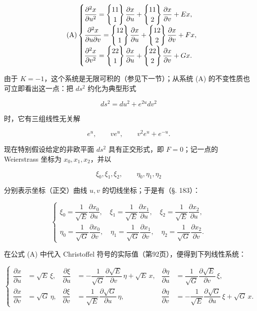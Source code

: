 \[
\tag{A}
\begin{cases}
\dfrac{\partial^2x}{\partial u^2}=
\left\{\begin{matrix}11\\1\end{matrix}\right\}\dfrac{\partial x}{\partial u}+
\left\{\begin{matrix}11\\2\end{matrix}\right\}\dfrac{\partial x}{\partial v}+Ex,\\[.7em]
\dfrac{\partial^2x}{\partial u\partial v}=
\left\{\begin{matrix}12\\1\end{matrix}\right\}\dfrac{\partial x}{\partial u}+
\left\{\begin{matrix}12\\2\end{matrix}\right\}\dfrac{\partial x}{\partial v}+Fx,\\[.7em]
\dfrac{\partial^2x}{\partial v^2}=
\left\{\begin{matrix}22\\1\end{matrix}\right\}\dfrac{\partial x}{\partial u}+
\left\{\begin{matrix}22\\2\end{matrix}\right\}\dfrac{\partial x}{\partial v}+Gx.
\end{cases}
\]

由于 $K=-1$，这个系统是无限可积的（参见下一节）；从系统 (A) 的不变性质也可立即看出这一点：把 $ds^2$ 约化为典型形式

\[
 ds^2=du^2+e^{2u}dv^2
\]

时，它有三组线性无关解

\[
 e^u,
 \qquad ve^u,
 \qquad v^2e^u+e^{-u}.
\]

现在特别假设给定的非欧平面 $ds^2$ 具有正交形式，即 $F=0$；记一点的 Weierstrass 坐标为 $x_0,x_1,x_2$，并以

\[
 \xi_0,\xi_1,\xi_2,
 \qquad
 \eta_0,\eta_1,\eta_2
\]

分别表示坐标（正交）曲线 $u,v$ 的切线坐标；于是有（§. 183）：

\[
\tag{25}
\begin{cases}
\xi_0=\dfrac1{\sqrt E}\dfrac{\partial x_0}{\partial u},
\quad
\xi_1=\dfrac1{\sqrt E}\dfrac{\partial x_1}{\partial u},
\quad
\xi_2=\dfrac1{\sqrt E}\dfrac{\partial x_2}{\partial u},\\[.8em]
\eta_0=\dfrac1{\sqrt G}\dfrac{\partial x_0}{\partial v},
\quad
\eta_1=\dfrac1{\sqrt G}\dfrac{\partial x_1}{\partial v},
\quad
\eta_2=\dfrac1{\sqrt G}\dfrac{\partial x_2}{\partial v}.
\end{cases}
\]

在公式 (A) 中代入 Christoffel 符号的实际值（第92页），便得到下列线性系统：

\[
\tag{A*}
\left\{
\begin{aligned}
\dfrac{\partial x}{\partial u}&=\sqrt E\,\xi,
&\dfrac{\partial\xi}{\partial u}&=-\dfrac1{\sqrt G}\dfrac{\partial\sqrt E}{\partial v}\,\eta+\sqrt E\,x,
&\dfrac{\partial\eta}{\partial u}&=\dfrac1{\sqrt G}\dfrac{\partial\sqrt E}{\partial v}\,\xi,\\[.8em]
\dfrac{\partial x}{\partial v}&=\sqrt G\,\eta,
&\dfrac{\partial\xi}{\partial v}&=\dfrac1{\sqrt E}\dfrac{\partial\sqrt G}{\partial u}\,\eta,
&\dfrac{\partial\eta}{\partial v}&=-\dfrac1{\sqrt E}\dfrac{\partial\sqrt G}{\partial u}\,\xi+\sqrt G\,x.
\end{aligned}
\right.
\]

